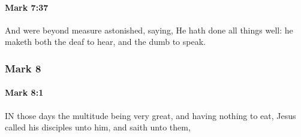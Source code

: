		\paragraph{Mark 7:37} %
			\label{MARK-7-37}

			And were beyond measure astonished, saying, He hath done all things well: he maketh both the deaf to hear, and the dumb to speak.

			\begin{framed}
			\scriptsize
				\begin{compactdesc}
					\item[SBLG] 
				\end{compactdesc}
			\end{framed}

	\subsubsection{Mark 8} %
		\label{MARK-8}
		
		\paragraph{Mark 8:1} %
			\label{MARK-8-1}

			IN those days the multitude being very great, and having nothing to eat, Jesus called his disciples unto him, and saith unto them,

